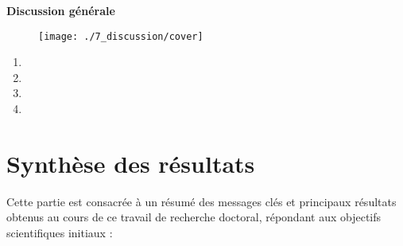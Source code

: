 \setcounter{section}{0} %
\renewcommand*{\theHsection}{\theHchapter.\the\value{section}} %

\centerline{\bfseries\textcolor{bleusection}{ \Huge Discussion générale}}  

\bigskip

\begin{figure}[H] 
	\begin{center}
	\texttt{[image: ./7\_discussion/cover]}
    \end{center}
\end{figure}

{\LARGE
\begin{enumerate}[label=\textcolor{bleusection}{\arabic*}{.}, leftmargin=2cm]
  \item {}
  \item {}
  \item {}
  \item {}
\end{enumerate}
}

\clearpage
\pagestyle{discussion}

\section{Synthèse des résultats}\label{discussion.1}

Cette partie est consacrée à un résumé des messages clés et principaux résultats obtenus au cours de ce travail de recherche doctoral, répondant aux objectifs scientifiques initiaux :

